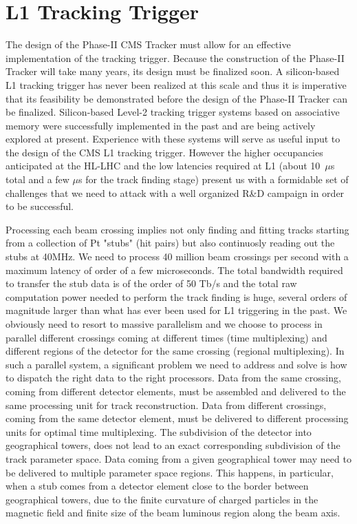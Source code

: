 \section{L1 Tracking Trigger}


\noindent 


	The design of the Phase-II CMS Tracker must allow for an effective implementation of the tracking trigger.  Because the construction of the Phase-II Tracker will take many years, its design must be finalized soon.  A silicon-based L1 tracking trigger has never been realized at this scale and thus it is imperative that its feasibility be demonstrated before the design of the Phase-II Tracker can be finalized.  Silicon-based Level-2 tracking trigger systems based on associative memory were successfully implemented in the past and are being actively explored at present. Experience with these systems will serve as useful input to the design of the CMS L1 tracking trigger. However the higher occupancies anticipated at the HL-LHC and the low latencies required at L1 (about 10~$\mu$s total and a few $\mu$s for the track finding stage) present us with a formidable set of challenges that we need to attack with a well organized R\&D campaign in order to be successful. 

	Processing each beam crossing implies not only finding and fitting tracks starting from a collection of Pt "stubs" (hit pairs) but also continuosly reading out the stubs at 40MHz. We need to process 40 million beam crossings per second with a maximum latency of order of a few microseconds. The total bandwidth required to transfer the stub data is of the order of 50 Tb/s and the total raw computation power needed to perform the track finding is huge, several orders of magnitude larger than what has ever been used for L1 triggering in the past. We obviously need to resort to massive parallelism and we choose to process in parallel different crossings coming at different times (time multiplexing) and different regions of the detector for the same crossing (regional multiplexing). In such a parallel system, a significant problem we need to address and solve is how to dispatch the right data to the right processors. Data from the same crossing, coming from different detector elements, must be assembled and delivered to the same processing unit for track reconstruction. Data from different crossings, coming from the same detector element, must be delivered to different processing units for optimal time multiplexing. The subdivision of the detector into geographical towers, does not lead to an exact corresponding subdivision of the track parameter space. Data coming from a given geographical tower may need to be delivered to multiple parameter space regions. This happens, in particular, when a stub comes from a detector element close to the border between geographical towers, due to the finite curvature of charged particles in the magnetic field and finite size of the beam luminous region along the beam axis. 

